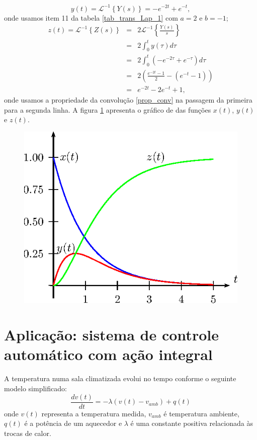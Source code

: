 \begin{equation}
y(t)=\mathcal{L}^{-1}\left\{Y(s)\right\}=-e^{-2t}+e^{-t},
\end{equation}
onde usamos item 11 da tabela \ref{tab_trans_Lap_1} com $a=2$ e $b=-1$;
\begin{eqnarray*}
z(t)=\mathcal{L}^{-1}\left\{Z(s)\right\}&=&2\mathcal{L}^{-1}\left\{\frac{Y(s)}{s}\right\}\\&=&2\int_0^ty(\tau)d\tau\\
&=&2\int_0^t\left(-e^{-2\tau}+e^{-\tau}\right)d\tau\\&=&2\left(\frac{e^{-2t}-1}{2}-\left(e^{-t}-1\right)\right)\\&=&e^{-2t}-2e^{-t}+1,
\end{eqnarray*}
 onde usamos a propriedade da convolução \ref{prop_conv} na passagem da primeira para a segunda linha. A figura \ref{reacao} apresenta o gráfico de das funções $x(t)$, $y(t)$ e $z(t)$.
 \begin{figure}[!ht]
\begin{center}
\includegraphics{cap_sistemas/pics/figura_4}\end{center}
\caption{\label{reacao}}
\end{figure}


\section{Aplicação: sistema de controle automático com ação integral}\label{sec:controle_integral}
A temperatura numa sala climatizada evolui no tempo conforme o seguinte modelo simplificado: 
\begin {equation}
  \frac {d v(t)}{dt}=-\lambda (v(t)-v_{amb}) + q(t)
 \end {equation}
  onde \(v(t)\) representa a temperatura medida, \(v_{amb}\) é temperatura ambiente, \(q(t)\) é a potência de um aquecedor e \(\lambda \) é uma constante positiva relacionada às trocas de calor. 
  
